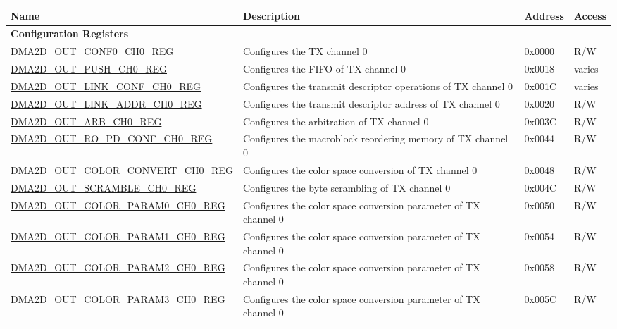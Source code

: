 \begin{longtable}{ | p{7cm} | p{11.5cm} | p{1.3cm} | p{2cm} | }
\hline\rowcolor{lightgray}
Name & Description &  Address & Access \\ \hline
\endhead
\multicolumn{4}{|l|}{\textbf{Configuration Registers}} \\ \hline
\hyperref[regdesc:DMA2DOUTCONF0CHNREG]{DMA2D\_OUT\_CONF0\_CH0\_REG} & Configures the TX channel 0 & 0x0000 & R/W \\ \hline
\hyperref[regdesc:DMA2DOUTPUSHCHNREG]{DMA2D\_OUT\_PUSH\_CH0\_REG} & Configures the FIFO of TX channel 0 & 0x0018 & varies \\ \hline
\hyperref[regdesc:DMA2DOUTLINKCONFCHNREG]{DMA2D\_OUT\_LINK\_CONF\_CH0\_REG} & Configures the transmit descriptor operations of TX channel 0 & 0x001C & varies \\ \hline
\hyperref[regdesc:DMA2DOUTLINKADDRCHNREG]{DMA2D\_OUT\_LINK\_ADDR\_CH0\_REG} & Configures the transmit descriptor address of TX channel 0 & 0x0020 & R/W \\ \hline
\hyperref[regdesc:DMA2DOUTARBCHNREG]{DMA2D\_OUT\_ARB\_CH0\_REG} & Configures the arbitration of TX channel 0 & 0x003C & R/W \\ \hline
\hyperref[regdesc:DMA2DOUTROPDCONFCH0REG]{DMA2D\_OUT\_RO\_PD\_CONF\_CH0\_REG} & Configures the macroblock reordering memory of TX channel 0 & 0x0044 & R/W \\ \hline
\hyperref[regdesc:DMA2DOUTCOLORCONVERTCHNREG]{DMA2D\_OUT\_COLOR\_CONVERT\_CH0\_REG} & Configures the color space conversion of TX channel 0 & 0x0048 & R/W \\ \hline
\hyperref[regdesc:DMA2DOUTSCRAMBLECHNREG]{DMA2D\_OUT\_SCRAMBLE\_CH0\_REG} & Configures the byte scrambling of TX channel 0 & 0x004C & R/W \\ \hline
\hyperref[regdesc:DMA2DOUTCOLORPARAM0CHNREG]{DMA2D\_OUT\_COLOR\_PARAM0\_CH0\_REG} & Configures the color space conversion parameter of TX channel 0 & 0x0050 & R/W \\ \hline
\hyperref[regdesc:DMA2DOUTCOLORPARAM1CHNREG]{DMA2D\_OUT\_COLOR\_PARAM1\_CH0\_REG} & Configures the color space conversion parameter of TX channel 0 & 0x0054 & R/W \\ \hline
\hyperref[regdesc:DMA2DOUTCOLORPARAM2CHNREG]{DMA2D\_OUT\_COLOR\_PARAM2\_CH0\_REG} & Configures the color space conversion parameter of TX channel 0 & 0x0058 & R/W \\ \hline
\hyperref[regdesc:DMA2DOUTCOLORPARAM3CHNREG]{DMA2D\_OUT\_COLOR\_PARAM3\_CH0\_REG} & Configures the color space conversion parameter of TX channel 0 & 0x005C & R/W \\ \hline

\end{longtable}
